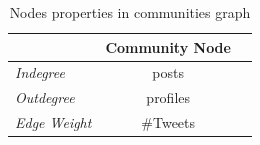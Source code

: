 \documentclass{llncs}
\begin{document}
\begin{table}[!htb]
\centering
\begin{tabular}{@{}lcr@{}}
\toprule
\textbf{}& \textbf{Community Node} \\ \midrule
{\emph{Indegree}} &  posts\\
{\emph{Outdegree}} & profiles \\ 
{\emph{Edge Weight}}& \#Tweets\\ \bottomrule
\end{tabular}
\caption{Nodes properties in communities graph}
\label{tbl:communitiesgraph}
\end{table}




\end{document}
